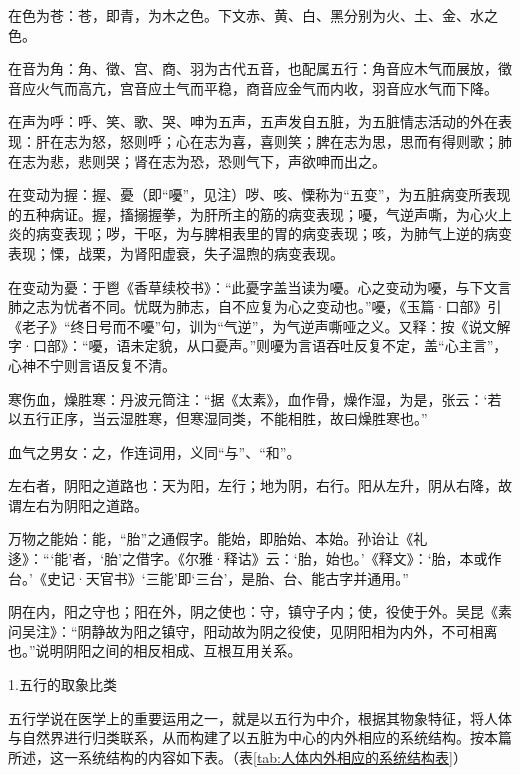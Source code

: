 \documentclass[12pt]{ctexbook}
\begin{document}
\begin{jiaozhu}
	\item 在色为苍：苍，即青，为木之色。下文赤、黄、白、黑分别为火、土、金、水之色。
	\item 在音为角：角、徵、宫、商、羽为古代五音，也配属五行：角音应木气而展放，徵音应火气而高亢，宫音应土气而平稳，商音应金气而内收，羽音应水气而下降。
	\item 在声为呼：呼、笑、歌、哭、呻为五声，五声发自五脏，为五脏情志活动的外在表现：肝在志为怒，怒则呼；心在志为喜，喜则笑；脾在志为思，思而有得则歌；肺在志为悲，悲则哭；肾在志为恐，恐则气下，声欲呻而出之。
	\item 在变动为握：握、憂（即“嚘”，见注）哕、咳、慄称为“五变”，为五脏病变所表现的五种病证。握，搐搦握拳，为肝所主的筋的病变表现；嚘，气逆声嘶，为心火上炎的病变表现；哕，干呕，为与脾相表里的胃的病变表现；咳，为肺气上逆的病变表现；慄，战栗，为肾阳虚衰，失子温煦的病变表现。
	\item 在变动为憂：于鬯《香草续校书》：“此憂字盖当读为嚘。心之变动为嚘，与下文言肺之志为忧者不同。忧既为肺志，自不应复为心之变动也。”嚘，《玉篇·口部》引《老子》“终日号而不嚘”句，训为“气逆”，为气逆声嘶哑之义。又释：按《说文解字·口部》：“嚘，语未定貌，从口憂声。”则嚘为言语吞吐反复不定，盖“心主言”，心神不宁则言语反复不清。
	\item 寒伤血，燥胜寒：丹波元筒注：“据《太素》，血作骨，燥作湿，为是，张云：‘若以五行正序，当云湿胜寒，但寒湿同类，不能相胜，故曰燥胜寒也。”
	\item 血气之男女：之，作连词用，义同“与”、“和”。
	\item 左右者，阴阳之道路也：天为阳，左行；地为阴，右行。阳从左升，阴从右降，故谓左右为阴阳之道路。
	\item 万物之能始：能，“胎”之通假字。能始，即胎始、本始。孙诒让《礼迻》：“‘能’者，‘胎’之借字。《尔雅·释诂》云：‘胎，始也。’《释文》：‘胎，本或作台。’《史记·天官书》‘三能’即‘三台’，是胎、台、能古字并通用。”
	\item 阴在内，阳之守也；阳在外，阴之使也：守，镇守子内；使，役使于外。吴昆《素问吴注》：“阴静故为阳之镇守，阳动故为阴之役使，见阴阳相为内外，不可相离也。”说明阴阳之间的相反相成、互根互用关系。
\end{jiaozhu}


1.五行的取象比类

五行学说在医学上的重要运用之一，就是以五行为中介，根据其物象特征，将人体与自然界进行归类联系，从而构建了以五脏为中心的内外相应的系统结构。按本篇所述，这一系统结构的内容如下表。（表\ref{tab:人体内外相应的系统结构表}）
\end{document}
